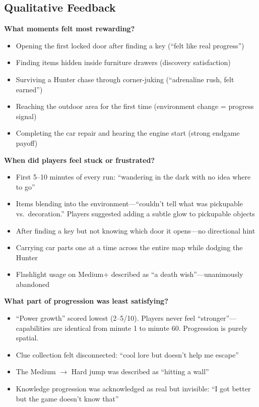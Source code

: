 \documentclass[11pt]{article}
\begin{document}
\subsection{Qualitative Feedback}

\textbf{What moments felt most rewarding?}
\begin{itemize}[nosep]
\item Opening the first locked door after finding a key (``felt like real progress'')
\item Finding items hidden inside furniture drawers (discovery satisfaction)
\item Surviving a Hunter chase through corner-juking (``adrenaline rush, felt earned'')
\item Reaching the outdoor area for the first time (environment change = progress signal)
\item Completing the car repair and hearing the engine start (strong endgame payoff)
\end{itemize}

\textbf{When did players feel stuck or frustrated?}
\begin{itemize}[nosep]
\item First 5--10 minutes of every run: ``wandering in the dark with no idea where to go''
\item Items blending into the environment---``couldn't tell what was pickupable vs.\ decoration.'' Players suggested adding a subtle glow to pickupable objects
\item After finding a key but not knowing which door it opens---no directional hint
\item Carrying car parts one at a time across the entire map while dodging the Hunter
\item Flashlight usage on Medium+ described as ``a death wish''---unanimously abandoned
\end{itemize}

\textbf{What part of progression was least satisfying?}
\begin{itemize}[nosep]
\item ``Power growth'' scored lowest (2--5/10). Players never feel ``stronger''---capabilities are identical from minute 1 to minute 60. Progression is purely spatial.
\item Clue collection felt disconnected: ``cool lore but doesn't help me escape''
\item The Medium $\to$ Hard jump was described as ``hitting a wall''
\item Knowledge progression was acknowledged as real but invisible: ``I got better but the game doesn't know that''
\end{itemize}
\end{document}
